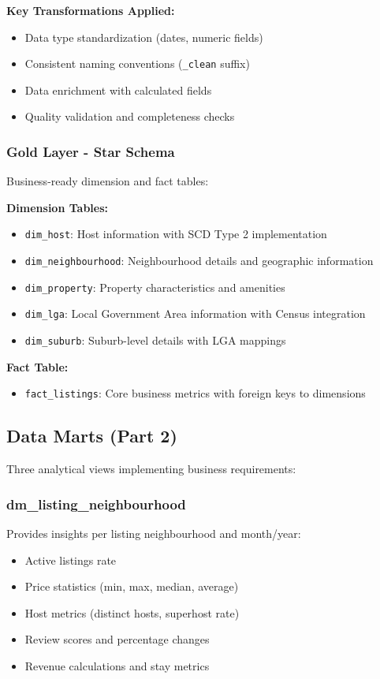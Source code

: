 \textbf{Key Transformations Applied:}
\begin{itemize}
  \item Data type standardization (dates, numeric fields)
  \item Consistent naming conventions (\texttt{\_clean} suffix)
  \item Data enrichment with calculated fields
  \item Quality validation and completeness checks
\end{itemize}

\subsubsection{Gold Layer - Star Schema}
Business-ready dimension and fact tables:

\textbf{Dimension Tables:}
\begin{itemize}
  \item \texttt{dim\_host}: Host information with SCD Type 2 implementation
  \item \texttt{dim\_neighbourhood}: Neighbourhood details and geographic information
  \item \texttt{dim\_property}: Property characteristics and amenities
  \item \texttt{dim\_lga}: Local Government Area information with Census integration
  \item \texttt{dim\_suburb}: Suburb-level details with LGA mappings
\end{itemize}

\textbf{Fact Table:}
\begin{itemize}
  \item \texttt{fact\_listings}: Core business metrics with foreign keys to dimensions
\end{itemize}

\subsection{Data Marts (Part 2)}
Three analytical views implementing business requirements:

\subsubsection{dm\_listing\_neighbourhood}
Provides insights per listing neighbourhood and month/year:
\begin{itemize}
  \item Active listings rate
  \item Price statistics (min, max, median, average)
  \item Host metrics (distinct hosts, superhost rate)
  \item Review scores and percentage changes
  \item Revenue calculations and stay metrics
\end{itemize}

